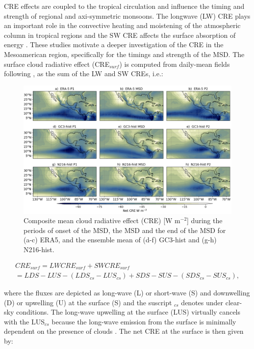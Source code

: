 CRE effects are coupled to the tropical circulation \citep{bony2004dynamic,webb2017} and influence the timing and strength of regional \citep{guo2015} and axi-symmetric \citep{byrne2020} monsoons. The longwave (LW) CRE plays an important role in the convective heating and moistening of the atmospheric column in tropical regions and the SW CRE affects the surface absorption of energy \citep{allan2011}. 
These studies motivate a deeper investigation of the CRE in the Mesoamerican region, specifically for the timings and strength of the MSD. The surface cloud radiative effect (CRE$_{surf}$) is computed from daily-mean fields following \cite{allan2011}, as the sum of the LW and SW CREs, i.e.:

\begin{figure}[b!]
\includegraphics[width=\linewidth]{figures/fig4_creclim_3.png}
\caption[Composites of cloud radiative effects]{Composite mean cloud radiative effect (CRE) [W m$^{-2}$] during the periods of onset of the MSD, the MSD and the end of the MSD for (a-c) ERA5, and the ensemble mean of (d-f) GC3-hist and (g-h) N216-hist.}
\label{fig:cre_comp}
\end{figure}

\begin{multline}
CRE_{surf}=LW CRE_{surf} +SW CRE_{surf} \\ = LDS-LUS -(LDS_{cs}-LUS_{cs})+SDS-SUS-(SDS_{cs}-SUS_{cs}),
\end{multline}

\noindent where the fluxes are depicted as long-wave (L) or short-wave (S) and downwelling (D) or upwelling (U) at the surface (S) and the suscript $_{cs}$ denotes under clear-sky conditions. The long-wave upwelling at the surface (LUS) virtually cancels with the LUS$_{cs}$ because the long-wave emission from the surface is minimally dependent on the presence of clouds \citep{allan2011}. The net CRE at the surface is then given by:

